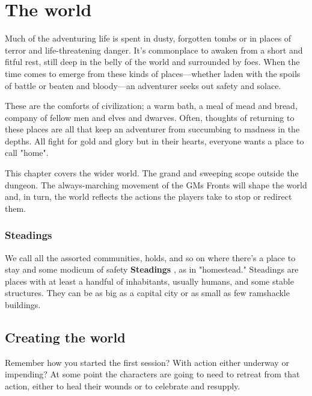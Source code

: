 \chapter{The world}
  
            

Much of the adventuring life is spent in dusty, forgotten tombs or in places of terror and life-threatening danger. It's commonplace to awaken from a short and fitful rest, still deep in the belly of the world and surrounded by foes. When the time comes to emerge from these kinds of places—whether laden with the spoils of battle or beaten and bloody—an adventurer seeks out safety and solace.

       

These are the comforts of civilization; a warm bath, a meal of mead and bread, company of fellow men and elves and dwarves. Often, thoughts of returning to these places are all that keep an adventurer from succumbing to madness in the depths. All fight for gold and glory but in their hearts, everyone wants a place to call "home".

       

This chapter covers the wider world. The grand and sweeping scope outside the dungeon. The always-marching movement of the GMs Fronts will shape the world and, in turn, the world reflects the actions the players take to stop or redirect them.

       
\subsection{Steadings}   
       

We call all the assorted communities, holds, and so on where there's a place to stay and some modicum of safety {\bf Steadings} , as in "homestead." Steadings are places with at least a handful of inhabitants, usually humans, and some stable structures. They can be as big as a capital city or as small as few ramshackle buildings.

       
\section{Creating the world}   
       

Remember how you started the first session? With action either underway or impending? At some point the characters are going to need to retreat from that action, either to heal their wounds or to celebrate and resupply.

